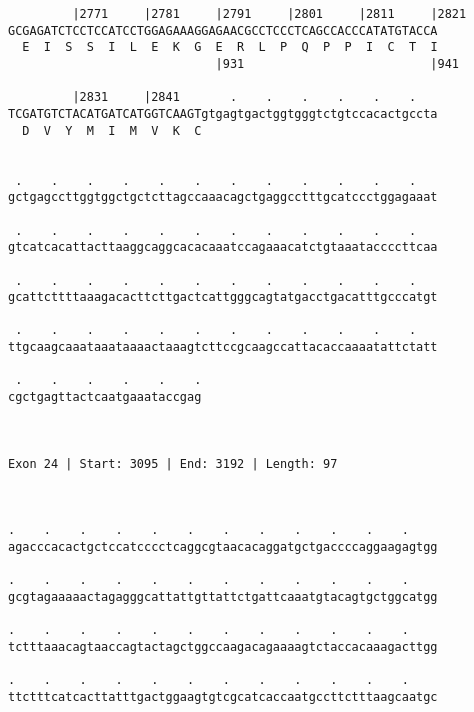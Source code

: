 \documentclass{article}
\begin{document}
\begin{Verbatim}
         |2771     |2781     |2791     |2801     |2811     |2821
GCGAGATCTCCTCCATCCTGGAGAAAGGAGAACGCCTCCCTCAGCCACCCATATGTACCA
  E  I  S  S  I  L  E  K  G  E  R  L  P  Q  P  P  I  C  T  I
                             |931                          |941
  
         |2831     |2841       .    .    .    .    .    .   
TCGATGTCTACATGATCATGGTCAAGTgtgagtgactggtgggtctgtccacactgccta
  D  V  Y  M  I  M  V  K  C                                 
                                                            
  
 .    .    .    .    .    .    .    .    .    .    .    .   
gctgagccttggtggctgctcttagccaaacagctgaggcctttgcatccctggagaaat
                                                            
 .    .    .    .    .    .    .    .    .    .    .    .   
gtcatcacattacttaaggcaggcacacaaatccagaaacatctgtaaataccccttcaa
                                                            
 .    .    .    .    .    .    .    .    .    .    .    .   
gcattcttttaaagacacttcttgactcattgggcagtatgacctgacatttgcccatgt
                                                            
 .    .    .    .    .    .    .    .    .    .    .    .   
ttgcaagcaaataaataaaactaaagtcttccgcaagccattacaccaaaatattctatt
                                                            
 .    .    .    .    .    .
cgctgagttactcaatgaaataccgag
                           
                           
 
Exon 24 | Start: 3095 | End: 3192 | Length: 97



.    .    .    .    .    .    .    .    .    .    .    .    
agacccacactgctccatcccctcaggcgtaacacaggatgctgaccccaggaagagtgg
                                                            
.    .    .    .    .    .    .    .    .    .    .    .    
gcgtagaaaaactagagggcattattgttattctgattcaaatgtacagtgctggcatgg
                                                            
.    .    .    .    .    .    .    .    .    .    .    .    
tctttaaacagtaaccagtactagctggccaagacagaaaagtctaccacaaagacttgg
                                                            
.    .    .    .    .    .    .    .    .    .    .    .    
ttctttcatcacttatttgactggaagtgtcgcatcaccaatgccttctttaagcaatgc
                                                            

\end{Verbatim}
\end{document}
